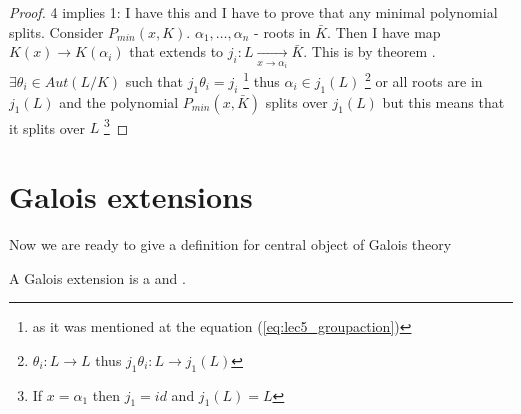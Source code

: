 \begin{theorem}
\begin{proof}
    4 implies 1:  I have this  and I have to prove
    that any minimal polynomial splits. Consider
    $P_{min}\left(x, K\right)$. $\alpha_1, \dots, \alpha_n$ - roots in
    $\bar{K}$. Then I have map $K\left(x\right) \to
    K\left(\alpha_i\right)$ that extends to
    $j_i: L \xrightarrow[x \to \alpha_i]{} \bar{K}$. This is by
    theorem .
    $\exists \theta_i \in Aut\left(L/K\right)$ such that
    $j_1 \theta_i = j_i$
    \footnote{
      as it was mentioned at the equation (\ref{eq:lec5_groupaction})
    }
    thus
    $\alpha_i \in j_1\left(L\right)$
    \footnote{
      $\theta_i: L \to L$ thus $j_1 \theta_i: L \to j_1(L)$
    }
    or all roots are in
    $j_1\left(L\right)$ and the polynomial
    $P_{min}\left(x, \bar{K}\right)$ splits over $j_1\left(L\right)$
    but this means that it splits over $L$
    \footnote{
      If $x = \alpha_1$ then $j_1 = id$ and $j_1(L) = L$
    }
  \end{proof}
\end{theorem}

\section{Galois extensions}

Now we are ready to give a definition for central object of Galois
theory

\begin{definition}
  A Galois extension is a  and
  .
  \label{def:galoisextension}
\end{definition}

